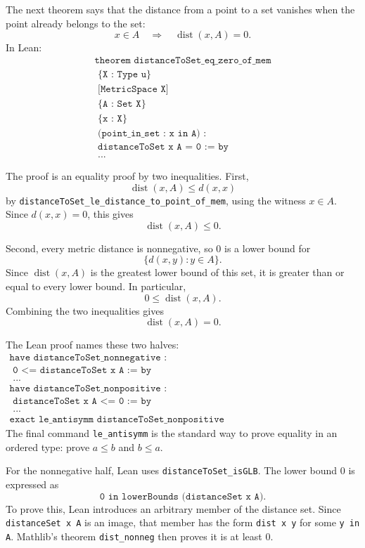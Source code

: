 \begin{remark*}
The next theorem says that the distance from a point to a set vanishes when the
point already belongs to the set:
\[
  x \in A \quad\Longrightarrow\quad \operatorname{dist}(x,A) = 0.
\]
In Lean:
\[
\begin{gathered}
  \texttt{theorem distanceToSet\_eq\_zero\_of\_mem}\\
  \texttt{\ \ \ \ \{X : Type u\}}\\
  \texttt{\ \ \ \ [MetricSpace X]}\\
  \texttt{\ \ \ \ \{A : Set X\}}\\
  \texttt{\ \ \ \ \{x : X\}}\\
  \texttt{\ \ \ \ (point\_in\_set : x in A) :}\\
  \texttt{\ \ \ \ distanceToSet x A = 0 := by}\\
  \texttt{\ \ ...}
\end{gathered}
\]

The proof is an equality proof by two inequalities. First,
\[
  \operatorname{dist}(x,A) \le d(x,x)
\]
by \texttt{distanceToSet\_le\_distance\_to\_point\_of\_mem}, using the witness
\(x \in A\). Since \(d(x,x)=0\), this gives
\[
  \operatorname{dist}(x,A) \le 0.
\]

Second, every metric distance is nonnegative, so \(0\) is a lower bound for
\[
  \{d(x,y) : y \in A\}.
\]
Since \(\operatorname{dist}(x,A)\) is the greatest lower bound of this set, it
is greater than or equal to every lower bound. In particular,
\[
  0 \le \operatorname{dist}(x,A).
\]
Combining the two inequalities gives
\[
  \operatorname{dist}(x,A)=0.
\]

The Lean proof names these two halves:
\[
\begin{gathered}
  \texttt{have distanceToSet\_nonnegative :}\\
  \texttt{\ \ 0 <= distanceToSet x A := by}\\
  \texttt{\ \ ...}\\
  \texttt{have distanceToSet\_nonpositive :}\\
  \texttt{\ \ distanceToSet x A <= 0 := by}\\
  \texttt{\ \ ...}\\
  \texttt{exact le\_antisymm distanceToSet\_nonpositive distanceToSet\_nonnegative.}
\end{gathered}
\]
The final command \texttt{le\_antisymm} is the standard way to prove equality
in an ordered type: prove \(a \le b\) and \(b \le a\).

For the nonnegative half, Lean uses \texttt{distanceToSet\_isGLB}. The lower
bound \(0\) is expressed as
\[
  \texttt{0 in lowerBounds (distanceSet x A)}.
\]
To prove this, Lean introduces an arbitrary member of the distance set. Since
\texttt{distanceSet x A} is an image, that member has the form
\texttt{dist x y} for some \texttt{y in A}. Mathlib's theorem
\texttt{dist\_nonneg} then proves it is at least \(0\).


\end{remark*}
